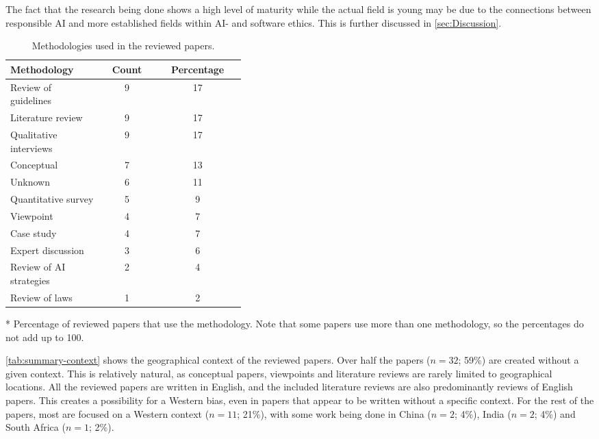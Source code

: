 The fact that the research being done shows a high level of maturity while the actual field is young may be due to the connections between responsible AI and more established fields within AI- and software ethics. This is further discussed in \autoref{sec:Discussion}.

\begin{table}[ht]
    \centering
    \caption{Methodologies used in the reviewed papers.}
    \label{tab:summary-methodology}
    \begin{threeparttable}
    \begin{tabular}{p{0.4\linewidth}cc}
    \toprule
        \textbf{Methodology} & \textbf{Count} & \textbf{Percentage}\tnote{*} \\
    \midrule
        Review of guidelines    & 9     & 17  \\
        Literature review       & 9     & 17  \\
        Qualitative interviews  & 9     & 17  \\
        Conceptual              & 7     & 13  \\
        Unknown                 & 6     & 11  \\
        Quantitative survey     & 5     & 9   \\
        Viewpoint               & 4     & 7   \\
        Case study              & 4     & 7   \\
        Expert discussion       & 3     & 6   \\
        Review of AI strategies & 2     & 4   \\
        Review of laws          & 1     & 2   \\
    \bottomrule
    \end{tabular}
    \begin{tablenotes}
        \footnotesize
        \item [*] Percentage of reviewed papers that use the methodology. Note that some papers use more than one methodology, so the percentages do not add up to 100.
    \end{tablenotes}
\end{threeparttable}
\end{table}

\autoref{tab:summary-context} shows the geographical context of the reviewed papers. Over half the papers ($n = 32$; 59\%) are created without a given context. This is relatively natural, as conceptual papers, viewpoints and literature reviews are rarely limited to geographical locations. All the reviewed papers are written in English, and the included literature reviews are also predominantly reviews of English papers. This creates a possibility for a Western bias, even in papers that appear to be written without a specific context. For the rest of the papers, most are focused on a Western context ($n = 11$; 21\%), with some work being done in China ($n = 2$; 4\%), India ($n = 2$; 4\%) and South Africa ($n = 1$; 2\%). 

